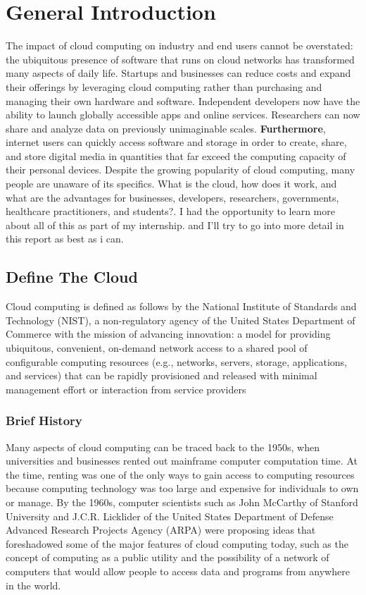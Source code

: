\chapter*{General Introduction}

The impact of cloud computing on industry and end users cannot be overstated: the ubiquitous presence of software that runs on cloud networks has transformed many aspects of daily life. Startups and businesses can reduce costs and expand their offerings by leveraging cloud computing rather than purchasing and managing their own hardware and software. Independent developers now have the ability to launch globally accessible apps and online services. Researchers can now share and analyze data on previously unimaginable scales. \textbf{Furthermore}, internet users can quickly access software and storage in order to create, share, and store digital media in quantities that far exceed the computing capacity of their personal devices.
\newline
Despite the growing popularity of cloud computing, many people are unaware of its specifics. What is the cloud, how does it work, and what are the advantages for businesses, developers, researchers, governments, healthcare practitioners, and students?.\newline
I had the opportunity to learn more about all of this as part of my internship. and I'll try to go into more detail in this report as best as i can.


\section{Define The Cloud }

Cloud computing is defined as follows by the National Institute of Standards and Technology (NIST), a non-regulatory agency of the United States Department of Commerce with the mission of advancing innovation:
\newline
a model for providing ubiquitous, convenient, on-demand network access to a shared pool of configurable computing resources (e.g., networks, servers, storage, applications, and services) that can be rapidly provisioned and released with minimal management effort or interaction from service providers

\subsection{Brief History}
Many aspects of cloud computing can be traced back to the 1950s, when universities and businesses rented out mainframe computer computation time. At the time, renting was one of the only ways to gain access to computing resources because computing technology was too large and expensive for individuals to own or manage. By the 1960s, computer scientists such as John McCarthy of Stanford University and J.C.R. Licklider of the United States Department of Defense Advanced Research Projects Agency (ARPA) were proposing ideas that foreshadowed some of the major features of cloud computing today, such as the concept of computing as a public utility and the possibility of a network of computers that would allow people to access data and programs from anywhere in the world.

